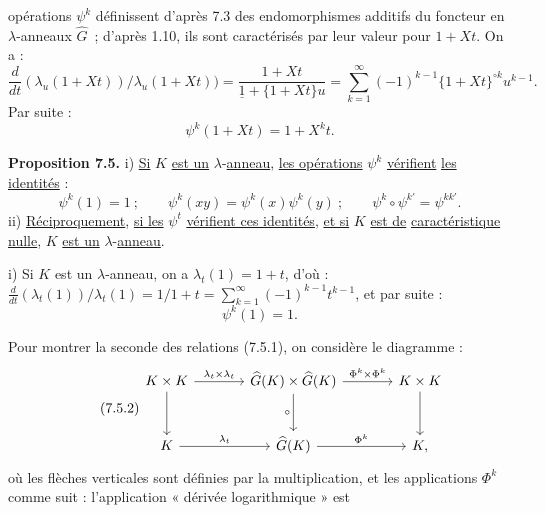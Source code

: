 
opérations \(\psi^k\)
définissent d'après 7.3 des endomorphismes additifs du foncteur en \(\lambda\)-anneaux \(\widehat G\)~; d'après 1.10, ils sont caractérisés par leur valeur pour \(1+Xt\). On a :
\[
  \frac{d}{dt}(\lambda_u(1+Xt))/\lambda_u(1+Xt))
  =
  \frac{1+Xt}{\underline{1}+\{1+Xt\}u}
  =
  \sum_{k=1}^{\infty}(-1)^{k-1}\{1+Xt\}^{\circ k}u^{k-1}.
\]
Par suite :
\begin{equation}\tag{7.4.1}
  \psi^k(1+Xt)=1+X^k t.
\end{equation}

\textbf{Proposition 7.5.} i) \uline{Si} \(K\) \uline{est un} \(\lambda\)-\uline{anneau}, \uline{les opérations} \(\psi^k\) \uline{vérifient} \uline{les identités} :
\begin{equation}\tag{7.5.1}
  \psi^k(1)=1~;\qquad
  \psi^k(xy)=\psi^k(x)\psi^k(y)~;\qquad
  \psi^k\circ\psi^{k'}=\psi^{kk'}.
\end{equation}
ii) \uline{Réciproquement}, \uline{si les} \(\psi^t\) \uline{vérifient ces identités}, \uline{et si} \(K\) \uline{est de} \uline{caractéristique nulle}, \(K\) \uline{est un} \(\lambda\)-\uline{anneau}.

i) Si \(K\) est un \(\lambda\)-anneau, on a \(\lambda_t(1)=1+t\), d'où : \(\frac{d}{dt}(\lambda_t(1))/\lambda_t(1)=1/1+t=\sum_{k=1}^{\infty}(-1)^{k-1}t^{k-1}\), et par suite :
\[
  \psi^k(1)=1.
\]

Pour montrer la seconde des relations (7.5.1), on considère le diagramme :
\begin{equation}\tag{7.5.2}
\begin{tikzcd}[column sep=large,row sep=large]
K\times K \arrow[r,"\lambda_t\times\lambda_t"] \arrow[d] &
\widehat G(K)\times\widehat G(K) \arrow[r,"\Phi^k\times\Phi^k"] \arrow[d,"\circ"'] &
K\times K \arrow[d]\\
K \arrow[r,"\lambda_t"] &
\widehat G(K) \arrow[r,"\Phi^k"] &
K ,
\end{tikzcd}
\end{equation}
où les flèches verticales sont définies par la multiplication, et les applications \(\Phi^k\) comme suit : l'application « dérivée logarithmique » est
